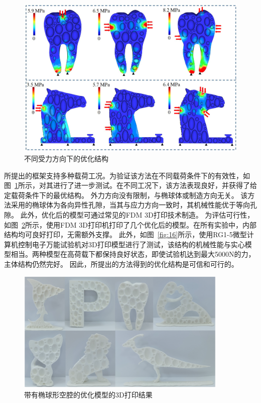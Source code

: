 \begin{figure}[htbp]
  \begin {center}
  \includegraphics[width=0.9 \textwidth]{./figures/self-support/fig13.png}
  \caption{不同受力方向下的优化结构}
  \label{fig12}
  \end {center}
\end{figure}
所提出的框架支持多种载荷工况。为验证该方法在不同载荷条件下的有效性，如图~\ref{fig12}所示，对其进行了进一步测试。在不同工况下，该方法表现良好，并获得了给定载荷条件下的最优结构。
外力方向没有限制，与椭球体或制造方向无关。
该方法采用的椭球体为各向异性孔隙，当其与应力方向一致时，其机械性能优于等向孔隙。
此外，优化后的模型可通过常见的FDM 3D打印技术制造。
为评估可行性，如图~\ref{fig:15}所示，使用FDM 3D打印机打印了几个优化后的模型。在所有实验中，内部结构均可良好打印，无需额外支撑。
此外，如图~\ref{fig:16}所示，使用RG1-5微型计算机控制电子万能试验机对3D打印模型进行了测试，该结构的机械性能与实心模型相当。两种模型在高荷载下都保持良好状态，即使试验机达到最大5000N的力，主体结构仍然完好。
因此，所提出的方法得到的优化结构是可信和可行的。

\begin{figure}[htbp]
  \begin {center}
  \includegraphics[width=0.9\textwidth]{./figures/self-support/fig16.png}
  \caption{带有椭球形空腔的优化模型的3D打印结果}
  \label{fig:15}
  \end {center}
\end{figure}

